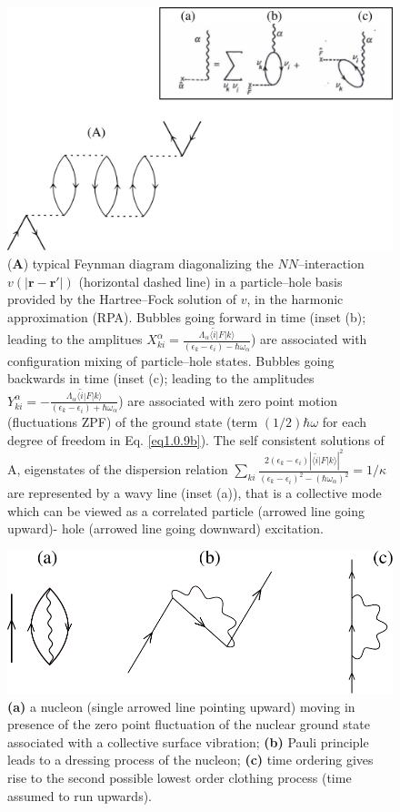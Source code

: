 \documentclass[a4paper,11pt]{book}
\numberwithin{equation}{section}
\numberwithin{figure}{section}
\numberwithin{table}{section}
\newcommand{\braket}[1]{\langle {#1} \rangle }
\begin{document}
\begin{figure}
	\centerline {
		\includegraphics*[width=12cm]{introduccion/figs/figpreface7}
	}
	\caption{(\textbf{A}) typical Feynman diagram diagonalizing the $NN$--interaction $v(|\mathbf r-\mathbf r'|)$ (horizontal dashed line) in a particle--hole basis provided by the Hartree--Fock solution of $v$, in the harmonic approximation (RPA). Bubbles going forward in time (inset (b); leading to the amplitues $X^\alpha_{ki}=\frac{\Lambda_\alpha\braket{\tilde i|F|k}}{(\epsilon_k-\epsilon_i)-\hbar\omega_\alpha}$) are associated with configuration mixing of particle--hole states. Bubbles going backwards in time (inset (c); leading to the amplitudes $Y^\alpha_{ki}=-\frac{\Lambda_\alpha\braket{\tilde i|F|k}}{(\epsilon_k-\epsilon_i)+\hbar\omega_\alpha}$) are associated with zero point motion (fluctuations ZPF) of the ground state (term $(1/2)\hbar\omega$ for each degree of freedom in Eq. \ref{eq1.0.9b}). The self consistent solutions of A, eigenstates of the dispersion relation $\sum_{ki}\frac{2(\epsilon_k-\epsilon_i)|\braket{\tilde i|F|k}|^2}{(\epsilon_k-\epsilon_i)^2-(\hbar\omega_\alpha)^2}=1/\kappa$ are represented by a wavy line (inset (a)), that is a collective mode which can be viewed as a correlated particle (arrowed line going upward)- hole (arrowed line going downward) excitation.}
	\label{fig1.0.7}
\end{figure}
\begin{figure}
	\centerline {
		\includegraphics*[width=12cm]{introduccion/figs/figpreface8}
	}
	\caption{\textbf{(a)} a nucleon (single arrowed line pointing upward) moving in presence of the zero point fluctuation of the nuclear ground state associated with a collective surface vibration; \textbf{(b)} Pauli principle leads to a dressing process of the nucleon; \textbf{(c)} time ordering gives rise to the second possible lowest order clothing process (time assumed to run upwards).}
	\label{fig1.0.8}
\end{figure}
\end{document}
